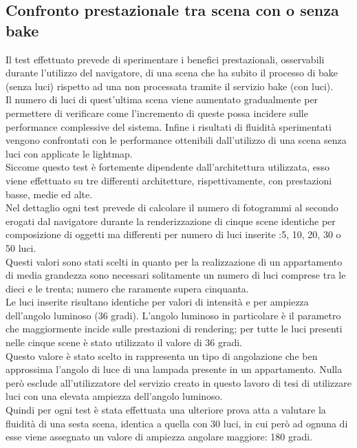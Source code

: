 \subsection{Confronto prestazionale tra scena con o senza bake}
\label{sec:chapter_prove_sperimentali_navigator_confronto_prestazionale}
Il test effettuato prevede di sperimentare i benefici prestazionali, osservabili durante l’utilizzo del navigatore, di una scena che ha subito il processo di bake (senza luci) rispetto ad una non processata tramite il servizio bake (con luci).
\\
Il numero di luci di quest’ultima scena viene aumentato gradualmente per permettere di verificare come l’incremento di queste possa incidere sulle performance complessive del sistema. 
Infine i risultati di fluidità sperimentati vengono confrontati con le performance ottenibili dall’utilizzo di una scena senza luci con applicate le lightmap.
\\
Siccome questo test è fortemente dipendente dall’architettura utilizzata, esso viene effettuato su tre differenti architetture, rispettivamente, con prestazioni basse, medie ed alte.
\\
Nel dettaglio ogni test prevede di calcolare il numero di fotogrammi al secondo erogati dal navigatore durante la renderizzazione di cinque scene identiche per composizione di oggetti ma differenti per numero di luci inserite :5, 10, 20, 30 o 50 luci.
\\
Questi valori sono stati scelti in quanto per la realizzazione di un appartamento di media grandezza sono necessari solitamente un numero di luci comprese tra le dieci e le trenta; numero che raramente supera cinquanta.
\\
Le luci inserite risultano identiche per valori di intensità e per ampiezza dell’angolo luminoso (36 gradi). 
L’angolo luminoso in particolare è il parametro che maggiormente incide sulle prestazioni di rendering; per tutte le luci presenti nelle cinque scene è stato utilizzato il valore di 36 gradi.
\\
Questo valore è stato scelto in rappresenta un tipo di angolazione che ben approssima l’angolo di luce di una lampada presente in un appartamento.
Nulla però esclude all’utilizzatore del servizio creato in questo lavoro di tesi di utilizzare luci con una elevata ampiezza dell’angolo luminoso.
\\ 
Quindi per ogni test è stata effettuata una ulteriore prova atta a valutare la fluidità di una sesta scena, identica a quella con 30 luci, in cui però ad ognuna di esse viene assegnato un valore di ampiezza angolare maggiore: 180 gradi.

